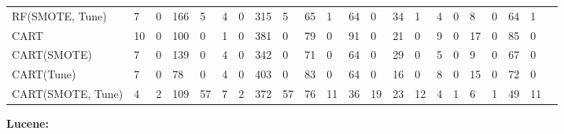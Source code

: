 \documentclass[compsoc, onecolumn]{IEEEtran}
\begin{document}
\begin{table*}[h]
{\begin{tabular}{l@{}|l@{~}l@{~}|l@{~}l@{~}|l@{~}l@{~}|l@{~}l@{~}|l@{~}l@{~}|l@{~}l@{~}|l@{~}l@{~}|l@{~}l@{~}|l@{~}l@{~}|l@{~}l@{~}l@{~}}
RF(SMOTE, Tune) & 7 & 0   & 166 & 5  & 4 & 0   & 315 & 5        & 65 & 1      & 64 & 0       & 34 & 1         & 4 & 0    & 8 & 0    & 64 & 1  \\
CART        & 10  & 0 & 100 & 0   & 1  & 0 & 381 & 0     & 79     & 0    & 91   & 0    & 21    & 0    & 9       & 0   & 17 & 0   & 85 & 0    &    \\
CART(SMOTE) & 7   & 0 & 139 & 0   & 4  & 0 & 342 & 0     & 71     & 0    & 64   & 0    & 29    & 0    & 5       & 0   & 9  & 0   & 67 & 0    &    \\
CART(Tune)  & 7   & 0 & 78  & 0   & 4  & 0 & 403 & 0     & 83     & 0    & 64   & 0    & 16    & 0    & 8       & 0   & 15 & 0   & 72 & 0    &    \\
CART(SMOTE, Tune) & 4 & 2   & 109 & 57 & 7 & 2   & 372 & 57       & 76 & 11     & 36 & 19      & 23 & 12        & 4 & 1    & 6 & 1    & 49 & 11\\ \hline
\end{tabular}}

{\normalsize {\bfseries \vspace{3pt} Lucene:\\}} {\footnotesize  \begin{tabular}{l@{}|l@{~}l@{~}|l@{~}l@{~}|l@{~}l@{~}|l@{~}l@{~}|l@{~}l@{~}|l@{~}l@{~}|l@{~}l@{~}|l@{~}l@{~}|l@{~}l@{~}|l@{~}l@{~}l@{~}} 
		

\end{tabular}}
\end{table*}
\end{document}
